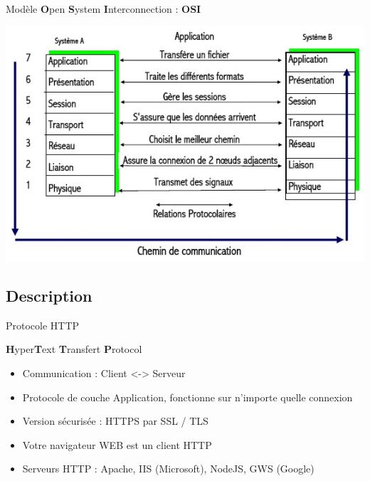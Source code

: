 \begin{frame}{Modèle \textbf{O}pen \textbf{S}ystem \textbf{I}nterconnection : \textbf{OSI}}

	\includegraphics[scale=0.75]{img_http/OSI.jpg}

\end{frame}




\subsection{Description}

\begin{frame}{Protocole HTTP}
	
	\begin{center}

		{\Large \textbf{H}yper\textbf{T}ext \textbf{T}ransfert \textbf{P}rotocol}  \vspace{2em}

		\begin{itemize}
			\item Communication : Client <-> Serveur\\
			\item Protocole de couche Application, fonctionne sur n'importe quelle connexion\\
			\item Version sécurisée : HTTPS par SSL / TLS
			\item Votre navigateur WEB est un client HTTP
			\item Serveurs HTTP : Apache, IIS (Microsoft), NodeJS, GWS (Google)
		\end{itemize}
	\end{center}

\end{frame}



